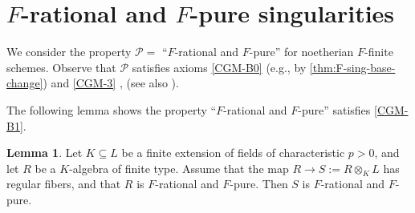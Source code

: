\documentclass[reqno,11pt]{amsart}
\numberwithin{equation}{section}
\theoremstyle{definition}
\theoremstyle{definition}
\newtheorem{lemma}[theorem]{Lemma}
\theoremstyle{definition}
\theoremstyle{remark}
\newcommand{\cP}{\mathcal{P}}
\begin{document}
\section{\texorpdfstring{$F$}{F}-rational and \texorpdfstring{$F$}{F}-pure singularities} \label{sec:FratFpure}

We consider the property $\cP =$ ``$F$-rational and $F$-pure'' for noetherian $F$-finite schemes. Observe that $\cP$ satisfies axioms \ref{CGM-B0} (e.g., by \cref{thm:F-sing-base-change}) and \ref{CGM-3} \cite[Theorem 3.2]{Has10}, \cite[Theorem 1.1]{Vel95} (see also \cite[Section 6]{MP25}).

The following lemma shows the property ``$F$-rational and $F$-pure'' satisfies \ref{CGM-B1}.




\begin{lemma} \label{B1:F-rational-F-pure} Let $K \subseteq L$ be a finite extension of fields of characteristic $p>0$, and let $R$ be a $K$-algebra of finite type. Assume that the map $R \to S:=R \otimes_K L$ has regular fibers, and that $R$ is $F$-rational and $F$-pure. Then $S$ is $F$-rational and $F$-pure.
\end{lemma}
\end{document}
